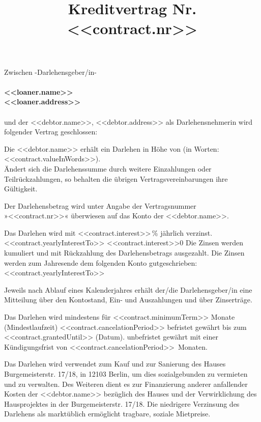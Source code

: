 \documentclass[]{scrartcl}
\title{\vspace{-10pt}Kreditvertrag Nr. <<contract.nr>>\vspace{-30pt}}
\date{}
\newcommand{\addressStreet}{Burgemeisterstr. 17/18}
\newcommand{\addressWithZIP}{\addressStreet, in 12103 Berlin}
\newcommand*{\yearlyInterestTo}{<<contract.yearlyInterestTo>>}
\newcommand*{\cancelationPeriod}{<<contract.cancelationPeriod>>}
\newcommand*{\interest}{<<contract.interest>>}
\newcommand*{\zeroInterest}{0}
\begin{document}
\maketitle \thispagestyle{fancy}

\noindent Zwischen -Darlehensgeber/in- \\ \\
 \textbf{<<loaner.name>>\\ <<loaner.address>>}  \\ \\
und der <<debtor.name>>, <<debtor.address>> als Darlehensnehmerin wird folgender Vertrag geschlossen:

\begin{contract}


Die <<debtor.name>> erhält ein Darlehen in Höhe von \textbf{} (in Worten: <<contract.valueInWords>>). \\
Ändert sich die Darlehenssumme durch weitere Einzahlungen oder Teilrückzahlungen, so behalten die
übrigen Vertragsvereinbarungen ihre Gültigkeit.

Der Darlehensbetrag wird unter Angabe der Vertragsnummer »<<contract.nr>>« überwiesen auf das Konto der <<debtor.name>>.

Das Darlehen wird  mit \interest\,\% jährlich verzinst. \\
\ifx\yearlyInterestTo\empty
  \ifx\interest\zeroInterest
  \else
  Die Zinsen werden kumuliert und mit Rückzahlung des Darlehensbetrags ausgezahlt.
  \fi
\else
Die Zinsen werden zum Jahresende dem folgenden Konto gutgeschrieben: \\ \yearlyInterestTo \\
\fi

Jeweils nach Ablauf eines Kalenderjahres erhält der/die Darlehensgeber/in eine Mitteilung über den
Kontostand, Ein- und Auszahlungen und über Zinserträge.

Das Darlehen wird mindestens für <<contract.minimumTerm>> Monate (Mindestlaufzeit)
\ifx\cancelationPeriod\empty
 befristet gewährt bis zum <<contract.grantedUntil>> (Datum).
\else
 unbefristet gewährt mit einer Kündigungsfrist von \cancelationPeriod\ Monaten.
\fi

Das Darlehen wird verwendet zum Kauf und zur Sanierung des Hauses \addressWithZIP, um dies sozialgebunden zu vermieten und zu verwalten. Des Weiteren dient es zur Finanzierung anderer anfallender Kosten der <<debtor.name>> bezüglich des Hauses und der Verwirklichung des Hausprojektes in der \addressStreet. Die niedrigere Verzinsung des Darlehens als marktüblich ermöglicht tragbare, soziale Mietpreise.


\end{contract}
\end{document}
